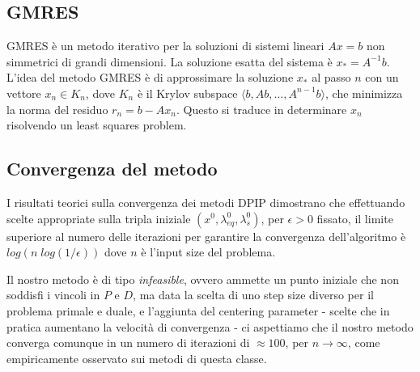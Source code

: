 \subsection{GMRES}\label{cap:GMRES}
GMRES è un metodo iterativo per la soluzioni di sistemi lineari $Ax=b$ non simmetrici di grandi dimensioni.
La soluzione esatta del sistema è $x_\ast = A^{-1}b$.
L'idea del metodo GMRES è di approssimare la soluzione $x_\ast$ al passo $n$ con un vettore $x_n \in K_n$, dove $K_n$ è il Krylov subspace $\langle b, Ab,\dots,A^{n-1}b\rangle$, che minimizza la norma del residuo $r_n = b - Ax_n$.
Questo si traduce in determinare $x_n$ risolvendo un least squares problem.


\subsection{Convergenza del metodo}\label{cap:Convergenza}

I risultati teorici sulla convergenza dei metodi DPIP \cite{Nocedal2006Numerical} dimostrano che effettuando scelte appropriate sulla tripla iniziale $(x^0, \lambda_{eq}^0, \lambda_s^0)$, per $\epsilon > 0$ fissato, il limite superiore al numero delle iterazioni per garantire la convergenza dell'algoritmo è $log(n\; log(1/\epsilon))$ dove $n$ è l'input size del problema.

Il nostro metodo è di tipo \textit{infeasible}, 
ovvero ammette un punto iniziale che non soddisfi i vincoli in $P$ e $D$, ma data la scelta di uno step size diverso per il problema primale e duale, e l'aggiunta del centering parameter - scelte che in pratica aumentano la velocità di convergenza - ci aspettiamo che il nostro metodo converga comunque in un numero di iterazioni di $\approx 100$, per $n \rightarrow \infty$, come empiricamente osservato sui metodi di questa classe.